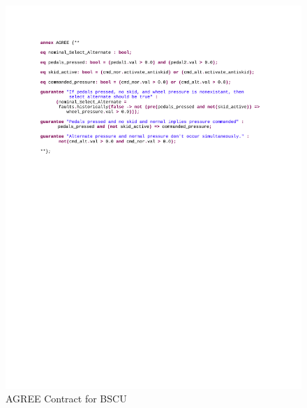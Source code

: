 \begin{figure}
\begin{center}
\includegraphics[trim=60 480 50 60,clip,width=\textwidth]{images/bscu.pdf}
\caption{AGREE Contract for BSCU }
\label{fig:agreeContract}
\end{center}
\end{figure}

